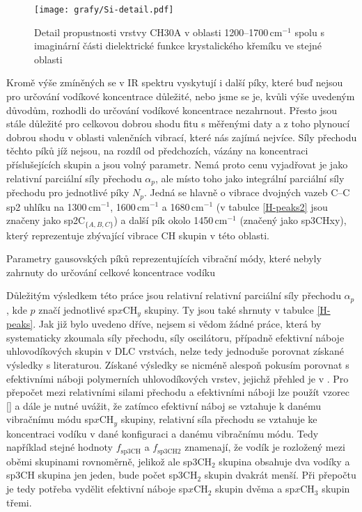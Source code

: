 \begin{figure}[tb]
	\texttt{[image: grafy/Si-detail.pdf]}
	\caption{Detail propustnosti vrstvy CH30A v oblasti 1200--1700\,cm$^{-1}$ spolu s ima\-gi\-nární části dielektrické funkce krystalického křemíku ve stejné oblasti}
	\label{Si-detail}
\end{figure}

Kromě výše zmíněných se v IR spektru vyskytují i další píky, které buď nejsou pro určování vodíkové koncentrace důležité, nebo jsme se je, kvůli výše uvedeným důvodům, rozhodli do určování vodíkové koncentrace nezahrnout. Přesto jsou stále důležité pro celkovou dobrou shodu fitu s měřenými daty a z toho plynoucí dobrou shodu v oblasti valenčních vibrací, které nás zajímá nejvíce. Síly přechodu těchto píků jíž nejsou, na rozdíl od předchozích, vázány na koncentraci příslušejících skupin a jsou volný parametr. 
Nemá proto cenu vyjadřovat je jako relativní parciální síly přechodu $\alpha_p$, ale místo toho jako integrální parciální síly přechodu pro jednotlivé píky $N_p$. Jedná se hlavně o vibrace dvojných vazeb C--C sp2 uhlíku na 1300\,cm$^{-1}$, 1600\,cm$^{-1}$ a 1680\,cm$^{-1}$ \cite{Robertson2002, Theye2001, Zajickova2011} (v tabulce \ref{H-peaks2} jsou značeny jako sp2C$_{\{A,B,C\}}$) a další pík okolo 1450\,cm$^{-1}$ (značený jako sp3CHxy), který reprezentuje zbývající vibrace CH skupin v této oblasti.

\begin{table}[tbp]
 \centering
	\renewcommand{\tabcolsep}{1pt}
 
 \caption{Parametry gausovských píků reprezentujících vibrační módy, které nebyly zahrnuty do určování celkové koncentrace vodíku}
\label{H-peaks2}
\end{table}

Důležitým výsledkem této práce jsou relativní relativní parciální síly přechodu $\alpha_p$, kde $p$ značí jednotlivé sp$x$CH$_y$ skupiny. Ty jsou také shrnuty v tabulce \ref{H-peaks}. Jak již bylo uvedeno dříve, nejsem si vědom žádné práce, která by systematicky zkoumala síly přechodu, síly oscilátoru, případně efektivní náboje uhlovodíkových skupin v DLC vrstvách, nelze tedy jednoduše porovnat získané výsledky s literaturou. 
Získané výsledky se nicméně alespoň pokusím porovnat s efektivními náboji polymerních uhlovodíkových vrstev, jejichž přehled je v \cite{Heitz1998}. Pro přepočet mezi relativními silami přechodu a efektivními náboji lze použít vzorec \ref{} a dále je nutné uvážit, že zatímco efektivní náboj se vztahuje k danému vibračnímu módu sp$x$CH$_y$ skupiny, relativní síla přechodu se vztahuje ke koncentraci vodíku v dané konfiguraci a danému vibračnímu módu. 
Tedy například stejné hodnoty $f_\mathrm{sp3CH}$ a $f_\mathrm{sp3CH2}$ znamenají, že vodík je rozložený mezi oběmi skupinami rovnoměrně, jelikož ale sp3CH$_2$ skupina obsahuje dva vodíky a sp3CH skupina jen jeden, bude počet sp3CH$_2$ skupin dvakrát menší. Při přepočtu je tedy potřeba vydělit efektivní náboje sp$x$CH$_2$ skupin dvěma a sp$x$CH$_3$ skupin třemi. 


